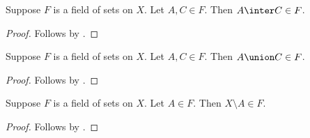 \begin{proposition}\label{field_of_sets_inter}
    Suppose $F$ is a field of sets on $X$.
    Let $A,C\in F$.
    Then $A\inter C\in F$.
\end{proposition}
\begin{proof}
    Follows by
        .
\end{proof}

\begin{proposition}\label{field_of_sets_union}
    Suppose $F$ is a field of sets on $X$.
    Let $A,C\in F$.
    Then $A\union C\in F$.
\end{proposition}
\begin{proof}
    Follows by
        .
\end{proof}

\begin{proposition}\label{field_of_sets_complement}
    Suppose $F$ is a field of sets on $X$.
    Let $A\in F$.
    Then $X\setminus A\in F$.
\end{proposition}
\begin{proof}
    Follows by .
\end{proof}

